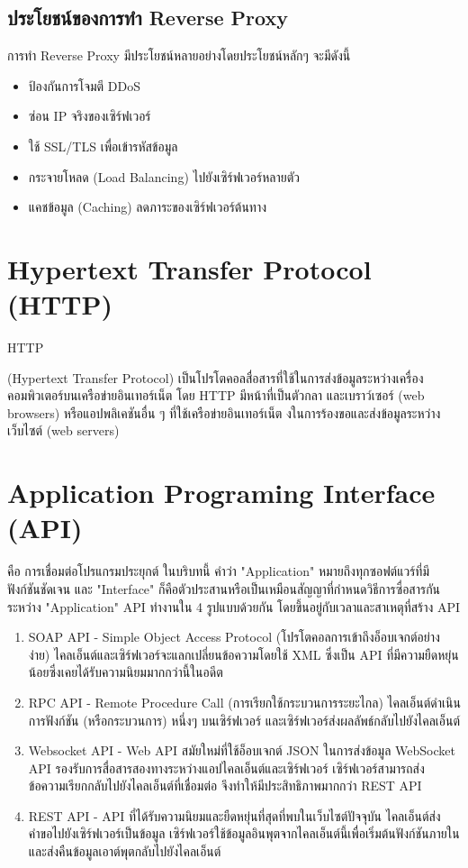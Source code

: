 \subsection{ประโยชน์ของการทำ Reverse Proxy}
การทำ Reverse Proxy มีประโยชน์หลายอย่างโดยประโยชน์หลักๆ จะมีดังนี้
\begin{itemize}
  \item ป้องกันการโจมตี DDoS
  \item ซ่อน IP จริงของเซิร์ฟเวอร์
  \item ใช้ SSL/TLS เพื่อเข้ารหัสข้อมูล
  \item กระจายโหลด (Load Balancing) ไปยังเซิร์ฟเวอร์หลายตัว
  \item แคชข้อมูล (Caching) ลดภาระของเซิร์ฟเวอร์ต้นทาง
\end{itemize}


\section{Hypertext Transfer Protocol (HTTP)}
\hspace{1.27cm}HTTP \raggedright(Hypertext Transfer Protocol) เป็นโปรโตคอลสื่อสารที่ใช้ในการส่งข้อมูลระหว่างเครื่องคอมพิวเตอร์บนเครือข่ายอินเทอร์เน็ต โดย HTTP 
มีหน้าที่เป็นตัวกลา และเบราว์เซอร์ (web browsers) หรือแอปพลิเคชันอื่น ๆ 
ที่ใช้เครือข่ายอินเทอร์เน็ต งในการร้องขอและส่งข้อมูลระหว่างเว็บไซต์ (web servers)


\section{Application Programing Interface (API) }
\hspace{1.27cm}คือ การเชื่อมต่อโปรแกรมประยุกต์ ในบริบทนี้ คำว่า "Application" หมายถึงทุกซอฟต์แวร์ที่มีฟังก์ชันชัดเจน และ "Interface" ก็คือตัวประสานหรือเป็นเหมือนสัญญาที่กำหนดวิธีการซื่อสารกันระหว่าง "Application" API ทำงานใน 4 รูปแบบด้วยกัน โดยขึ้นอยู่กับเวลาและสาเหตุที่สร้าง API
\begin{enumerate}
  \item SOAP API - Simple Object Access Protocol (โปรโตคอลการเข้าถึงอ็อบเจกต์อย่างง่าย) ไคลเอ็นต์และเซิร์ฟเวอร์จะแลกเปลี่ยนข้อความโดยใช้ XML ซึ่งเป็น API ที่มีความยืดหยุ่นน้อยซึ่งเคยได้รับความนิยมมากกว่านี้ในอดีต
  \item RPC API - Remote Procedure Call (การเรียกใช้กระบวนการระยะไกล) ไคลเอ็นต์ดำเนินการฟังก์ชัน (หรือกระบวนการ) หนึ่งๆ บนเซิร์ฟเวอร์ และเซิร์ฟเวอร์ส่งผลลัพธ์กลับไปยังไคลเอ็นต์
  \item Websocket API - Web API สมัยใหม่ที่ใช้อ็อบเจกต์ JSON ในการส่งข้อมูล WebSocket API รองรับการสื่อสารสองทางระหว่างแอปไคลเอ็นต์และเซิร์ฟเวอร์ เซิร์ฟเวอร์สามารถส่งข้อความเรียกกลับไปยังไคลเอ็นต์ที่เชื่อมต่อ จึงทำให้มีประสิทธิภาพมากกว่า REST API
  \item REST API - API ที่ได้รับความนิยมและยืดหยุ่นที่สุดที่พบในเว็บไซต์ปัจจุบัน ไคลเอ็นต์ส่งคำขอไปยังเซิร์ฟเวอร์เป็นข้อมูล เซิร์ฟเวอร์ใช้ข้อมูลอินพุตจากไคลเอ็นต์นี้เพื่อเริ่มต้นฟังก์ชันภายในและส่งคืนข้อมูลเอาต์พุตกลับไปยังไคลเอ็นต์
\end{enumerate}


